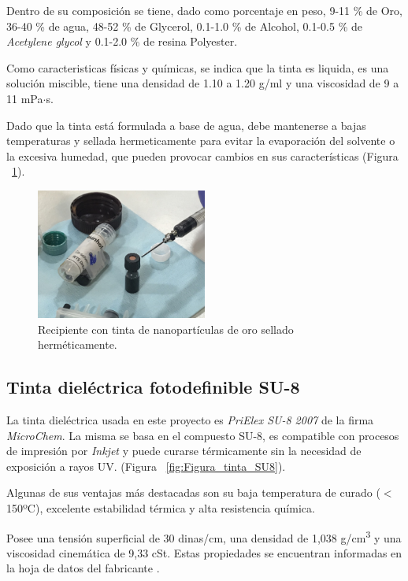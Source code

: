 Dentro de su composición se tiene, dado como porcentaje en peso, 9-11 \% de Oro, 36-40 \% de agua, 48-52 \% de Glycerol, 0.1-1.0 \% de Alcohol, 0.1-0.5 \% de \textit{Acetylene glycol} y 0.1-2.0 \% de resina Polyester.

Como caracteristicas físicas y químicas, se indica que la tinta es liquida, es una solución miscible, tiene una densidad de 1.10 a 1.20 g/ml y una viscosidad de 9 a 11 mPa$\cdot$s.

Dado que la tinta está formulada a base de agua, debe mantenerse a bajas temperaturas y sellada hermeticamente para evitar la evaporación del solvente o la excesiva humedad, que pueden provocar cambios en sus características (Figura ~\ref{fig:Figura_tinta_Au}).

\begin{figure}[H]
  \centering
    \includegraphics[width=0.5\textwidth]{Figuras/Figura_tinta_Au}
  \caption{Recipiente con tinta de nanopartículas de oro sellado herméticamente.}
  \label{fig:Figura_tinta_Au}
\end{figure}

\subsection{Tinta dieléctrica fotodefinible SU-8}
La tinta dieléctrica usada en este proyecto es \emph{PriElex SU-8 2007} de la firma \emph{MicroChem}. La misma se basa en el compuesto SU-8, es compatible con procesos de impresión por \textit{Inkjet} y puede curarse térmicamente sin la necesidad de exposición a rayos UV. (Figura ~\ref{fig:Figura_tinta_SU8}).

Algunas de sus ventajas más destacadas son su baja temperatura de curado ($<$ 150ºC), excelente estabilidad térmica y alta resistencia química.

Posee una tensión superficial de 30 dinas/cm, una densidad de 1,038 g/cm\textsuperscript{3} y una viscosidad cinemática de 9,33 cSt. Estas propiedades se encuentran informadas en la hoja de datos del fabricante \cite{PriElexSU8}.

